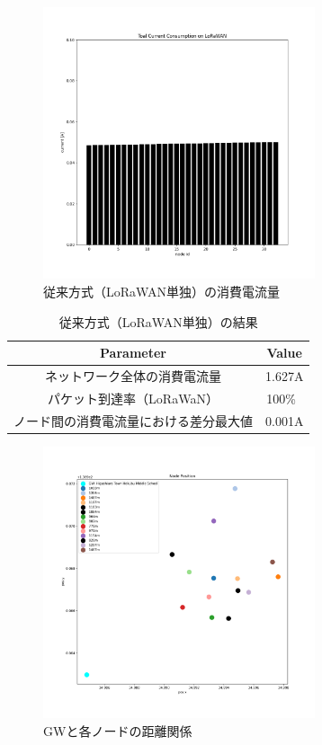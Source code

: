 \documentclass[Japanese]{dicomopapers}
\begin{document}
\begin{figure}[h]
    \centering
    \includegraphics[width=8cm]{img/lorawan_energy_consumption.png}
    \caption{従来方式（LoRaWAN単独）の消費電流量}
    \label{energy_consumption_only_lorawan}
\end{figure}

\begin{table}[h]
    \centering
    \caption{従来方式（LoRaWAN単独）の結果}
    \label{tab:lorawan_result}
    \begin{tabular}{|c|c|}
    \hline
    \textbf{Parameter} & \textbf{Value}   \\ \hline
    ネットワーク全体の消費電流量              & 1.627A     \\ \hline
    パケット到達率（LoRaWaN）               & 100\%\     \\ \hline
    ノード間の消費電流量における差分最大値      & 0.001A     \\ \hline
    \end{tabular}
\end{table}

\begin{figure}[h]
    \centering
    \includegraphics[width=8cm]{img/garbage_box_location.png}
    \caption{GWと各ノードの距離関係}
    \label{garbage_box_diss_location}
\end{figure}
\end{document}
